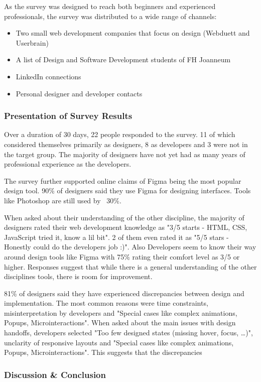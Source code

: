 As the survey was designed to reach both beginners and experienced professionals, the survey was
distributed to a wide range of channels: 
\begin{itemize}
    \item Two small web development companies that focus on design (Webduett and Userbrain) 
    \item A list of Design and Software Development students of FH Joanneum
    \item LinkedIn connections
    \item Personal designer and developer contacts
\end{itemize}


\subsubsection{Presentation of Survey Results}
Over a duration of 30 days, 22 people responded to the survey. 11 of which considered themselves
primarily as designers, 8 as developers and 3 were not in the target group. The majority of
designers have not yet had as many years of professional experience as the developers. 

The survey further supported online claims of Figma being the most popular design tool. 90\% of
designers said they use Figma for designing interfaces. Tools like Photoshop are still used by
~30\%.

When asked about their understanding of the other discipline, the majority of designers rated their
web development knowledge as "3/5 starts - HTML, CSS, JavaScript tried it, know a lil bit". 2 of
them even rated it as "5/5 stars - Honestly could do the developers job :)". Also Developers seem to
know their way around design tools like Figma with 75\% rating their comfort level as 3/5 or higher.
Responses suggest that while there is a general understanding of the other disciplines tools, there
is room for improvement.

81\% of designers said they have experienced discrepancies between design and implementation. The
most common reasons were time constraints, misinterpretation by developers and "Special
cases like complex animations, Popups, Microinteractions". When asked about the main issues with
design handoffs, developers selected "Too few designed states (missing hover, focus, \dots)",
unclarity of responsive layouts and "Special cases like complex animations, Popups,
Microinteractions". 
This suggests that the discrepancies 


\subsubsection{Discussion \& Conclusion}